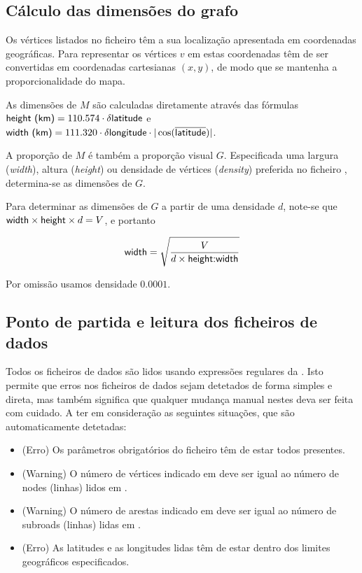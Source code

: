 \documentclass[relatorio.tex]{subfiles}
\begin{document}
\subsection{Cálculo das dimensões do grafo}

Os vértices listados no ficheiro  têm a sua localização
apresentada em coordenadas geográficas. Para representar os vértices
$v$ em  estas coordenadas têm de ser
convertidas em coordenadas cartesianas $(x,y)$, de modo que
se mantenha a proporcionalidade do mapa.

As dimensões de $M$ são calculadas diretamente através das fórmulas
$\sfmath{height (km)}=110.574\cdot\delta\sfmath{latitude}$ e
$\sfmath{width (km)}=111.320\cdot\delta\sfmath{longitude}\cdot
|\cos(\overline{\sfmath{latitude}})|$.

A proporção  de $M$ é também a proporção visual
$G$. Especificada uma largura (\textit{width}), altura (\textit{height})
ou densidade de vértices (\textit{density}) preferida no ficheiro
, determina-se as dimensões de $G$.

Para determinar as dimensões de $G$ a partir de uma densidade $d$,
note-se que $\sfmath{width}\times\sfmath{height}\times d=V$, e
portanto

\begin{equation*}
\sfmath{width}=\sqrt{\frac{V}{d\times\sfmath{height:width}}}
\end{equation*}

Por omissão usamos densidade $0.0001$.



\subsection{Ponto de partida e leitura dos ficheiros de dados}
\label{subsec:startmap}

Todos os ficheiros de dados são lidos usando expressões regulares
 da . Isto permite que erros nos ficheiros
de dados sejam detetados de forma simples e direta, mas também
significa que qualquer mudança manual nestes deva ser feita com
cuidado. A ter em consideração as seguintes situações, que são
automaticamente detetadas:

\begin{itemize}
\item (Erro) Os parâmetros obrigatórios do ficheiro  têm
de estar todos presentes.
\item (Warning) O número de vértices indicado em  deve ser
igual ao número de nodes (linhas) lidos em .
\item (Warning) O número de arestas indicado em  deve ser
igual ao número de subroads (linhas) lidas em .
\item (Erro) As latitudes e as longitudes lidas têm de estar dentro
dos limites geográficos especificados.
\end{itemize}
\end{document}
